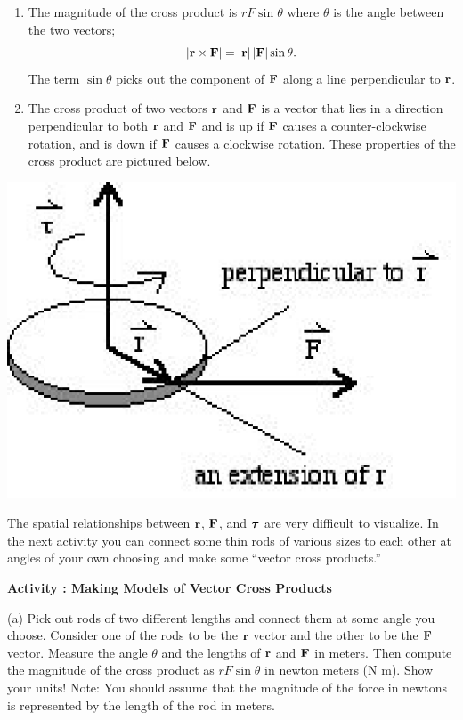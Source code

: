 \begin{enumerate}
\item The magnitude of the cross product is $rF\sin\theta$ where \( \theta  \)
is the angle between the two vectors; 
\[
\left| {\bf r}\times {\bf F}\right| =\left| {\bf r}\right| \left| {\bf F}\right| \sin \theta .\]
The term \( \sin \theta  \) picks out the component of \( {\bf F} \)
along a line perpendicular to \( {\bf r} \).
\item The cross product of two vectors \( {\bf r} \) and \( {\bf F} \)
is a vector that lies in a direction perpendicular to both \( {\bf r} \)
and \( {\bf F} \) and is up if \( {\bf F} \) causes
a counter-clockwise rotation, and is down if \( {\bf F} \) causes
a clockwise rotation. These properties of the cross product are pictured below.
\end{enumerate}
\vspace{0.3cm}
{\par\centering \includegraphics{ang_mom/ang_mom_fig3.eps} \par}
\vspace{0.3cm}

The spatial relationships between \( {\bf r} \), \( {\bf F} \),
and \( {\mbox{\boldmath$\tau$} } \) are very difficult to visualize. In the next
activity you can connect some thin rods of various sizes to each other at angles
of your own choosing and make some ``vector cross products.''

\textbf{Activity  : Making Models of Vector Cross Products} 

(a) Pick out rods of two different lengths and connect them at some angle you
choose. Consider one of the rods to be the \( {\bf r} \) vector
and the other to be the \( {\bf F} \) vector. Measure the angle
\( \theta  \) and the lengths of \( {\bf r} \) and \( {\bf F} \)
in meters. Then compute the magnitude of the cross product as 
$rF\sin \theta $
in newton meters (N m). Show your units! Note: You should assume that the magnitude
of the force in newtons is represented by the length of the rod in meters.
\vspace{20mm}


